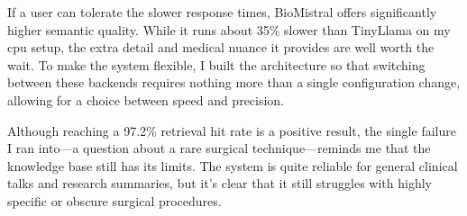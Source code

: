 If a user can tolerate the slower response times, BioMistral offers significantly higher semantic quality. While it runs about 35\% slower than TinyLlama on my \ac{cpu} setup, the extra detail and medical nuance it provides are well worth the wait. To make the system flexible, I built the architecture so that switching between these backends requires nothing more than a single configuration change, allowing for a choice between speed and precision. 

Although reaching a 97.2\% retrieval hit rate is a positive result, the single failure I ran into---a question about a rare surgical technique---reminds me that the knowledge base still has its limits. The system is quite reliable for general clinical talks and research summaries, but it's clear that it still struggles with highly specific or obscure surgical procedures.

